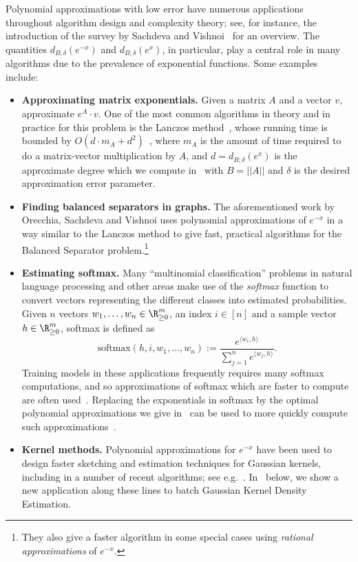 Polynomial approximations with low error have numerous applications throughout algorithm design and complexity theory; see, for instance, the introduction of the survey by Sachdeva and Vishnoi~\cite{sachdeva2014faster} for an overview. 
The quantities $d_{B; \delta} (e^{-x})$ and $d_{B; \delta} (e^{x})$, in particular, play a central role in many algorithms due to the prevalence of exponential functions. Some examples include:
\begin{itemize}
    \item \textbf{Approximating matrix exponentials.} Given a matrix $A$ and a vector $v$, approximate $e^A \cdot v$. One of the most common algorithms in theory and in practice for this problem is the Lanczos method~\cite{lanczos1950iteration}, whose running time is bounded by $O(d \cdot m_A + d^2)$~\cite{musco2018stability}, where $m_A$ is the amount of time required to do a matrix-vector multiplication by $A$, and $d = d_{B; \delta} (e^{x})$ is the approximate degree which we compute in~ with $B = ||A||$ and $\delta$ is the desired approximation error parameter.
    \item \textbf{Finding balanced separators in graphs.} The aforementioned work by Orecchia, Sachdeva and Vishnoi \cite{orecchia2012approximating} uses polynomial approximations of $e^{-x}$ in a way similar to the Lanczos method to give fast, practical algorithms for the Balanced Separator problem.\footnote{They also give a faster algorithm in some special cases using \emph{rational approximations} of $e^{-x}$.}
    \item \textbf{Estimating softmax.} Many ``multinomial classification'' problems in natural language processing and other areas make use of the \emph{softmax} function to convert vectors representing the different classes into estimated probabilities. Given $n$ vectors $w_1, \ldots, w_n \in \R_{\geq 0}^m$, an index $i \in [n]$ and a sample vector $h \in \R_{\geq 0}^m$, softmax is defined as $$\text{softmax}(h,i,w_1,\ldots,w_n) := \frac{e^{\langle w_i, h \rangle}}{\sum_{j=1}^n e^{\langle w_j, h \rangle}}.$$ Training models in these applications frequently requires many softmax computations, and so approximations of softmax which are faster to compute are often used~\cite{chen2015strategies}. Replacing the exponentials in softmax by the optimal polynomial approximations we give in~ can be used to more quickly compute such approximations~\cite{joulin2017efficient,nilsson2014hardware}.
    \item \textbf{Kernel methods.} Polynomial approximations for $e^{-x}$ have been used to design faster sketching and estimation techniques for Gaussian kernels, including in a number of recent algorithms; see e.g.~\cite{yang2003improved,lee2019finding,alman2020algorithms,ahle2020oblivious}. In~ below, we show a new application along these lines to batch Gaussian Kernel Density Estimation.
\end{itemize}



